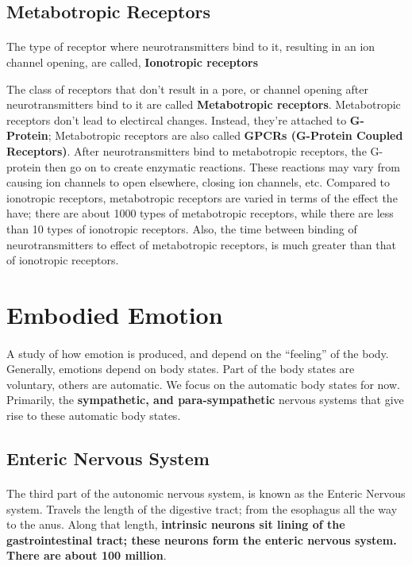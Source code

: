 \documentclass[12pt, a4paper]{article}
\begin{document}
\subsection{Metabotropic Receptors}
\paragraph*{}
The type of receptor where neurotransmitters bind to it, resulting in an ion channel opening, are called,
\textbf{Ionotropic receptors}

The class of receptors that don't result in a pore, or channel opening after neurotransmitters bind to it are 
called \textbf{Metabotropic receptors}. Metabotropic receptors don't lead to electircal changes.
Instead, they're attached to \textbf{G-Protein}; Metabotropic receptors are also called
\textbf{GPCRs (G-Protein Coupled Receptors)}. After neurotransmitters bind to metabotropic receptors,
the G-protein then go on to create enzymatic reactions. These reactions may vary from causing ion channels to open elsewhere, closing ion channels,
etc. Compared to ionotropic receptors, metabotropic receptors are varied in terms of the effect the have; there are about 
1000 types of metabotropic receptors, while there are less than 10 types of ionotropic receptors. Also,
the time between binding of neurotransmitters to effect of metabotropic receptors, is much greater than that of 
ionotropic receptors.

\section{Embodied Emotion}
\paragraph*{}
A study of how emotion is produced, and depend on the ``feeling'' of the body. Generally,
emotions depend on body states. Part of the body states are voluntary, others are automatic. We focus on
the automatic body states for now. Primarily, the \textbf{sympathetic, and para-sympathetic} nervous systems that give rise to 
these automatic body states.

\subsection{Enteric Nervous System}
\paragraph*{}
The third part of the autonomic nervous system, is known as the Enteric Nervous system.
Travels the length of the digestive tract; from the esophagus all the way to the anus.
Along that length, \textbf{intrinsic neurons sit lining of the gastrointestinal tract; these neurons form the 
enteric nervous system. There are about 100 million}.
\end{document}
